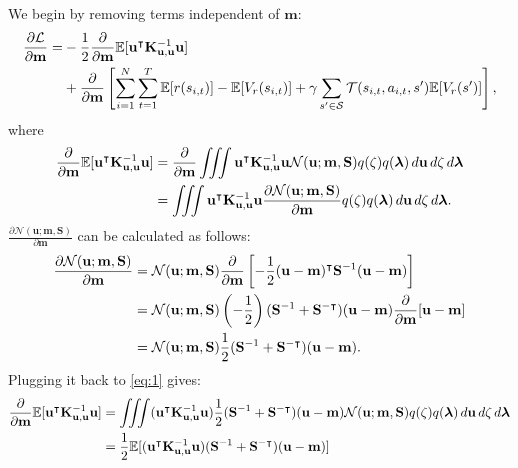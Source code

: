 \documentclass{mprop}
\theoremstyle{definition}
\begin{document}
We begin by removing terms independent of $\mathbf{m}$:
\[
  \begin{split}
    \frac{\partial\mathcal{L}}{\partial\mathbf{m}} =
    &-\frac{1}{2}\frac{\partial}{\partial\mathbf{m}}\mathbb{E}[\mathbf{u}^\intercal\mathbf{K}_{\mathbf{u},\mathbf{u}}^{-1}\mathbf{u}] \\
    &+ \frac{\partial}{\partial\mathbf{m}}\left[\sum_{i=1}^N \sum_{t=1}^T \mathbb{E}[r(s_{i,t})] -
      \mathbb{E}[V_r(s_{i,t})] + \gamma\sum_{s' \in \mathcal{S}}
      \mathcal{T}(s_{i,t}, a_{i,t}, s')\mathbb{E}[V_r(s')]\right],
  \end{split}
\]
where
\begin{equation} \label{eq:1}
\begin{split} %
    \dm\mathbb{E}[\mathbf{u}^\intercal\Kuu^{-1}\mathbf{u}] &=
    \dm\iiint\mathbf{u}^\intercal\Kuu^{-1}\mathbf{u}\mathcal{N}(\mathbf{u};
    \mathbf{m},
    \mathbf{S})q(\zeta)q(\bm\lambda)\,d\mathbf{u}\,d\zeta\,d\bm\lambda \\
    &= \iiint\mathbf{u}^\intercal\Kuu^{-1}\mathbf{u}\frac{\partial \mathcal{N}(\mathbf{u}; \mathbf{m}, \mathbf{S})}{\partial \mathbf{m}} q(\zeta)q(\bm\lambda)\,d\mathbf{u}\,d\zeta\,d\bm\lambda.
  \end{split}
\end{equation}
$\frac{\partial \mathcal{N}(\mathbf{u}; \mathbf{m}, \mathbf{S})}{\partial \mathbf{m}}$ can be calculated as
follows: %
\[
  \begin{split}
    \frac{\partial \mathcal{N}(\mathbf{u}; \mathbf{m}, \mathbf{S})}{\partial\mathbf{m}} &=
    \mathcal{N}(\mathbf{u}; \mathbf{m},
    \mathbf{S})\frac{\partial}{\partial\mathbf{m}}\left[-\frac{1}{2}(\mathbf{u} -
      \mathbf{m})^\intercal\mathbf{S}^{-1}(\mathbf{u} - \mathbf{m})\right] \\
    &= \mathcal{N}(\mathbf{u}; \mathbf{m},
    \mathbf{S})\left(-\frac{1}{2}\right)(\mathbf{S}^{-1} +
    \mathbf{S}^{-\intercal})(\mathbf{u} - \mathbf{m})\frac{\partial}{\partial\mathbf{m}}[\mathbf{u} -
    \mathbf{m}] \\
    &= \mathcal{N}(\mathbf{u}; \mathbf{m},
    \mathbf{S})\frac{1}{2}(\mathbf{S}^{-1} + \mathbf{S}^{-\intercal})(\mathbf{u}
    - \mathbf{m}).
  \end{split}
\]
Plugging it back to \eqref{eq:1} gives:
\[
  \begin{split}
    \frac{\partial}{\partial\mathbf{m}}\mathbb{E}[\mathbf{u}^\intercal\mathbf{K}_{\mathbf{u},\mathbf{u}}^{-1}\mathbf{u}] &=
    \iiint(\mathbf{u}^\intercal\mathbf{K}_{\mathbf{u},\mathbf{u}}^{-1}\mathbf{u})\frac{1}{2}(\mathbf{S}^{-1} +
    \mathbf{S}^{-\intercal})(\mathbf{u} - \mathbf{m})\mathcal{N}(\mathbf{u};
    \mathbf{m},
    \mathbf{S})q(\zeta)q(\bm\lambda)\,d\mathbf{u}\,d\zeta\,d\bm\lambda \\
    &=
    \frac{1}{2}\mathbb{E}[(\mathbf{u}^\intercal\mathbf{K}_{\mathbf{u},\mathbf{u}}^{-1}\mathbf{u})(\mathbf{S}^{-1}
    + \mathbf{S}^{-\intercal})(\mathbf{u} - \mathbf{m})]
  \end{split}
\]
\end{document}
